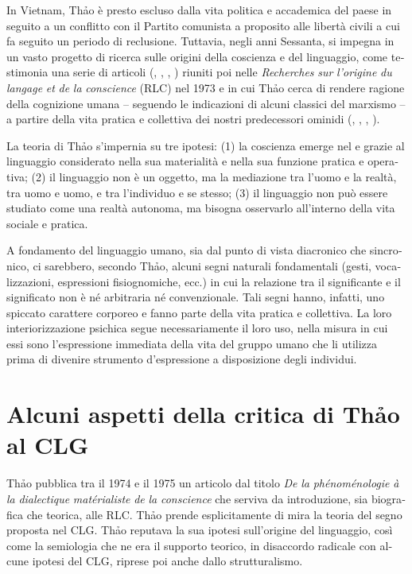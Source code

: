 \documentclass[output=paper]{langsci/langscibook}
\begin{document}
\begin{otherlanguage}{italian}
In Vietnam, Thảo è presto escluso dalla vita politica e accademica del paese in seguito a un conflitto con il Partito comunista a proposito alle libertà civili a cui fa seguito un periodo di reclusione. Tuttavia, negli anni Sessanta, si impegna in un vasto progetto di ricerca sulle origini della coscienza e del linguaggio, come testimonia una serie di articoli (\citealt{thao_mouvement_1966}, \citeyear{thao_du_1969}, \citeyear{thao_du_1969-1}, \citeyear{thao_du_1970}) riuniti poi nelle \textit{Recherches} \textit{sur} \textit{l’origine} \textit{du} \textit{langage} \textit{et} \textit{de} \textit{la} \textit{conscience} (RLC) nel 1973 e in cui Thảo cerca di rendere ragione della cognizione umana – seguendo le indicazioni di alcuni classici del marxismo – a partire della vita pratica e collettiva dei nostri predecessori ominidi (\citealt{federici_viet_1970}, \citealt{caveing_recherche_1974}, \citealt{haudricourt_tran_1974}, \citealt{frederic_tran_1974}).

La teoria di Thảo s’impernia su tre ipotesi: (1) la coscienza emerge nel e grazie al linguaggio considerato nella sua materialità e nella sua funzione pratica e operativa; (2) il linguaggio non è un oggetto, ma la mediazione tra l’uomo e la realtà, tra uomo e uomo, e tra l’individuo e se stesso; (3) il linguaggio non può essere studiato come una realtà autonoma, ma bisogna osservarlo all’interno della vita sociale e pratica.

A fondamento del linguaggio umano, sia dal punto di vista diacronico che sincronico, ci sarebbero, secondo Thảo, alcuni segni naturali fondamentali (gesti, vocalizzazioni, espressioni fisiognomiche, ecc.) in cui la relazione tra il significante e il significato non è né arbitraria né convenzionale. Tali segni hanno, infatti, uno spiccato carattere corporeo e fanno parte della vita pratica e collettiva. La loro interiorizzazione psichica segue necessariamente il loro uso, nella misura in cui essi sono l’espressione immediata della vita del gruppo umano che li utilizza prima di divenire strumento d’espressione a disposizione degli individui.

\section{Alcuni aspetti della critica di Thảo al CLG}

Thảo pubblica tra il 1974 e il 1975 un articolo dal titolo \textit{De} \textit{la} \textit{phénoménologie} \textit{à} \textit{la} \textit{dialectique} \textit{matérialiste} \textit{de} \textit{la} \textit{conscience} che serviva da introduzione, sia biografica che teorica, alle RLC. Th\textlatin{ả}o prende esplicitamente di mira la teoria del segno proposta nel CLG. Th\textlatin{ả}o reputava la sua ipotesi sull’origine del linguaggio, così come la semiologia che ne era il supporto teorico, in disaccordo radicale con alcune ipotesi del CLG, riprese poi anche dallo strutturalismo.


\end{otherlanguage}
\end{document}
